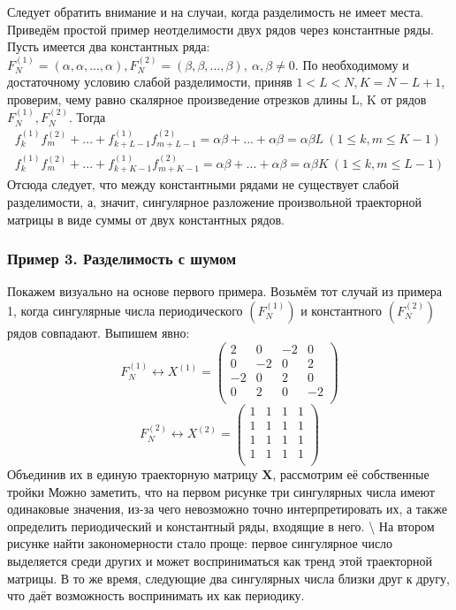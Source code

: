 \documentclass[
]{article}
\begin{document}
\redline Следует обратить внимание и на случаи, когда разделимость не
имеет места. Приведём простой пример неотделимости двух рядов через
константные ряды. Пусть имеется два константных ряда:
\(F^{(1)}_N=(\alpha, \alpha, ..., \alpha), F^{(2)}_N=(\beta, \beta, ..., \beta), \ \alpha, \beta \not = 0\).
По необходимому и достаточному условию слабой разделимости, приняв
\(1 < L < N, K = N - L + 1\), проверим, чему равно скалярное
произведение отрезков длины L, K от рядов \(F^{(1)}_N, F^{(2)}_N\).
Тогда \begin{align*}
    f^{(1)}_kf^{(2)}_m + ... + f^{(1)}_{k+L-1}f^{(2)}_{m+L-1} = \alpha \beta + ... + \alpha \beta = \alpha \beta L \ (1 \leq k, m \leq K-1)
    \\
    f^{(1)}_kf^{(2)}_m +... + f^{(1)}_{k+K-1}f^{(2)}_{m+K-1} = \alpha \beta + ... + \alpha \beta = \alpha \beta K \ (1 \leq k, m \leq L-1)
\end{align*} Отсюда следует, что между константными рядами не существует
слабой разделимости, а, значит, сингулярное разложение произвольной
траекторной матрицы в виде суммы от двух константных рядов.

\subsubsection{Пример 3. Разделимость с шумом}

Покажем визуально на основе первого примера. Возьмём тот случай из
примера 1, когда сингулярные числа периодического \((F^{(1)}_N)\) и
константного \((F^{(2)}_N)\) рядов совпадают. Выпишем явно: \[
F^{(1)}_N \longleftrightarrow X^{(1)}=
\begin{pmatrix}
    2 & 0 & -2& 0 \\
    0 & -2 & 0 & 2 \\
    -2& 0 & 2 & 0 \\
    0 & 2& 0 & -2 \\
\end{pmatrix}
\] \[
F^{(2)}_N \longleftrightarrow X^{(2)} =
\begin{pmatrix}
    1 & 1 & 1 & 1 \\
    1 & 1 & 1 & 1 \\
    1 & 1 & 1 & 1 \\
    1 & 1 & 1 & 1 \\
\end{pmatrix}
\] Объединив их в единую траекторную матрицу \(\textbf{X}\), рассмотрим
её собственные тройки \newpage Можно заметить, что на первом рисунке три
сингулярных числа имеют одинаковые значения, из-за чего невозможно точно
интерпретировать их, а также определить периодический и константный
ряды, входящие в него. \textbackslash{} На втором рисунке найти
закономерности стало проще: первое сингулярное число выделяется среди
других и может восприниматься как тренд этой траекторной матрицы. В то
же время, следующие два сингулярных числа близки друг к другу, что даёт
возможность воспринимать их как периодику.
\end{document}
